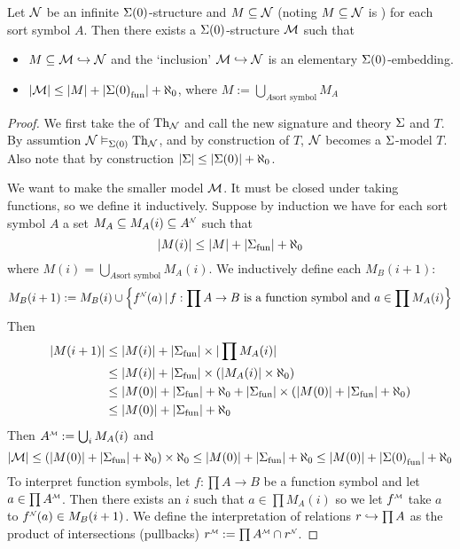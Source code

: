\begin{prop}
    Let $\mathcal{N}$ be an infinite $\Sigma(0)$-structure and $M \subseteq \mathcal{N}$
    (noting $M \subseteq \mathcal{N}$ is )
    for each sort symbol $A$.
    Then there exists a $\Sigma(0)$-structure $\mathcal{M}$ such that 
    \begin{itemize}
        \item $M \subseteq \mathcal{M} \hookrightarrow \mathcal{N}$ 
            and the `inclusion' $\mathcal{M} \hookrightarrow \mathcal{N}$ 
            is an elementary $\Sigma(0)$-embedding.
        \item $|\mathcal{M}| \leq |M| + |{\Sigma(0)}_\mathrm{fun}| + \aleph_0$,
            where $M := \bigcup_{A \text{sort symbol}} M_A$
    \end{itemize}
\end{prop}
\begin{proof}
    We first take the  
    of $\mathrm{Th}_{\mathcal{N}}$ and call the new signature and theory $\Sigma$ and $T$.
    By assumtion $\mathcal{N} \vDash_{\Sigma(0)} \mathrm{Th}_{\mathcal{N}}$, 
    and by construction of $T$, $\mathcal{N}$ becomes a $\Sigma$-model $T$.
    Also note that by construction $\left\vert \Sigma \right\vert \leq \left\vert \Sigma(0) \right\vert + \aleph_0$.

    We want to make the smaller model $\mathcal{M}$.
    It must be closed under taking functions, so we define it inductively.
    Suppose by induction we have for each sort symbol $A$ a 
    set $M_A \subs M_A(i) \subs \nnintp{A}$ such that 
    \[
        |M(i)| \leq |M| + |{\Sigma}_\mathrm{fun}| + \aleph_0
    \] 
    where $M(i) = \bigcup_{A \text{sort symbol}} M_A(i)$. 
    We inductively define each $M_B(i+1)$:
    \[
        M_B(i+1) := M_B(i) \cup \set{\nnintp{f}(a) \st 
        f : \prod A \to B \text{ is a function symbol and } a \in \prod M_A(i)}
    \]
    Then \begin{align*}
        |M(i+1)| 
        &\leq   |M(i)| + |{\Sigma}_\mathrm{fun}| \times |\prod M_A(i)|\\
        &\leq   |M(i)| + |{\Sigma}_\mathrm{fun}| \times (|M_A(i)| \times \aleph_0)\\
        &\leq   |M(0)| + |{\Sigma}_\mathrm{fun}| + \aleph_0 + |{\Sigma}_\mathrm{fun}| 
        \times (|M(0)| + |{\Sigma}_\mathrm{fun}| + \aleph_0)\\
        &\leq   |M(0)| + |{\Sigma}_\mathrm{fun}| + \aleph_0
    \end{align*}
    Then $\mmintp{A} := \bigcup_{i} M_A(i)$ and 
    \[
        |\mathcal{M}| \leq (|M(0)| + |{\Sigma}_\mathrm{fun}| + \aleph_0) \times \aleph_0 \leq
        |M(0)| + |{\Sigma}_\mathrm{fun}| + \aleph_0 
        \leq |M(0)| + |{\Sigma(0)}_\mathrm{fun}| + \aleph_0
    \]
    To interpret function symbols, let $f : \prod A \to B$
    be a function symbol and let $a \in \prod \mmintp{A}$.
    Then there exists an $i$ such that $a \in \prod M_A(i)$
    so we let $\mmintp{f}$ take $a$ to $\nnintp{f}(a) \in M_B(i+1)$.
    We define the interpretation of relations 
    $r \hookrightarrow \prod A$ as the product of intersections (pullbacks)
    $\mmintp{r} := \prod \mmintp{A} \cap \nnintp{r}$.


\end{proof}
